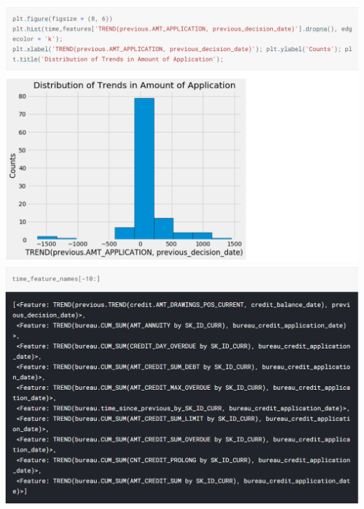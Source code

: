 \documentclass[twoside,a4paper]{article}
\begin{document}
\includegraphics[scale=.7]{21.png}\\
\includegraphics[scale=.7]{22.png}
\end{document}
